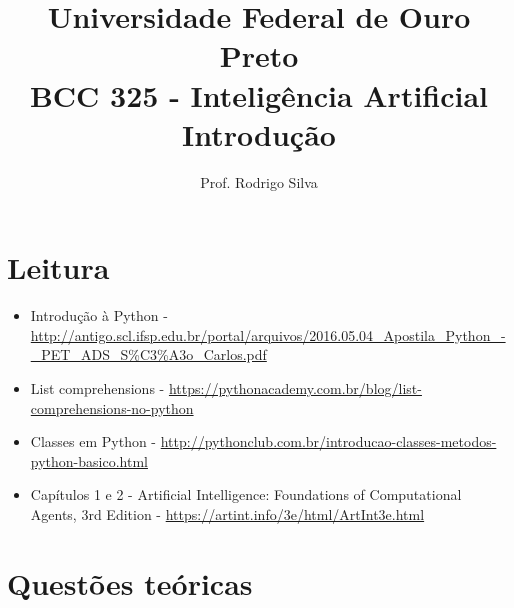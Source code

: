 \documentclass{article}
\title{\vspace{-2 cm}Universidade Federal de Ouro Preto \\ BCC 325 - Inteligência Artificial \\ Introdução}
\author{Prof. Rodrigo Silva}
\date{}
\begin{document}
\maketitle



\section{Leitura}

\begin{itemize}
    \item Introdução à Python - \url{http://antigo.scl.ifsp.edu.br/portal/arquivos/2016.05.04_Apostila\_Python\_-\_PET\_ADS\_S\%C3\%A3o_Carlos.pdf}
    \item List comprehensions - \url{https://pythonacademy.com.br/blog/list-comprehensions-no-python}
    \item Classes em Python - \url{http://pythonclub.com.br/introducao-classes-metodos-python-basico.html}
    \item Capítulos 1 e 2 - Artificial Intelligence: Foundations of Computational Agents,  3rd Edition - \url{https://artint.info/3e/html/ArtInt3e.html}
\end{itemize}


\section{Questões teóricas}
\end{document}
